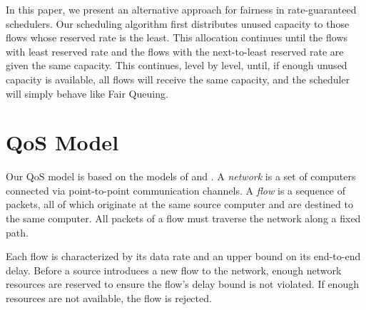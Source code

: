 \documentclass[conference]{IEEEtran}
\begin{document}
{In this paper, we present an alternative approach for fairness in 
rate-guaranteed schedulers. Our scheduling algorithm first distributes unused 
capacity to those flows whose reserved rate is the least. This allocation 
continues until the flows with least reserved rate and the flows with the 
next-to-least reserved rate are given the same capacity. This continues, level 
by level, until, if enough unused capacity is available, all flows will receive 
the same capacity, and the scheduler will simply behave like Fair Queuing.
}

%
\section{QoS Model}
\label{sec:QoS-Model}
%

Our QoS model is based on the models of \cite{Cobb-Flow-Theory-ToN} and 
\cite{leaveintime}. A {\em network} is a set of computers connected via 
point-to-point communication channels. A {\em flow} is a sequence of packets, 
all of which originate at the same source computer and are destined to the 
same computer. All packets of a flow must traverse the network along a fixed 
path. 

Each flow is characterized by its data rate and an upper bound on its 
end-to-end delay. Before a source introduces a new flow to the network, enough 
network resources are reserved to ensure the flow's delay bound is not 
violated. If enough resources are not available, the flow is rejected. 
\end{document}
